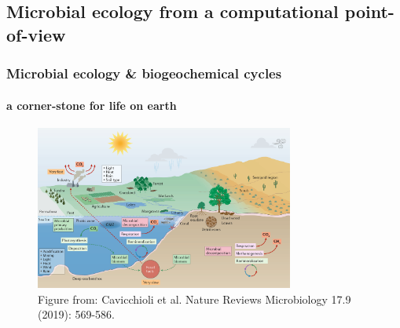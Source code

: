 \documentclass{beamer}
\begin{document}
   \fi


   \begin{darkframes}
      \section{
         Microbial ecology from a computational point-of-view
      }
   \end{darkframes}

   \begin{frame}

      \frametitle{Microbial ecology \& biogeochemical cycles}
      \framesubtitle{a corner-stone for life on earth}

      \begin{figure}
         \centering
         \includegraphics[width=85mm]{resources/ecosystem_functioning.png}
         \caption{
            \scriptsize Figure from: Cavicchioli et al.
            \scriptsize Nature Reviews Microbiology 17.9 (2019): 569-586.
         }
      \end{figure}
   \end{frame}
\end{document}

